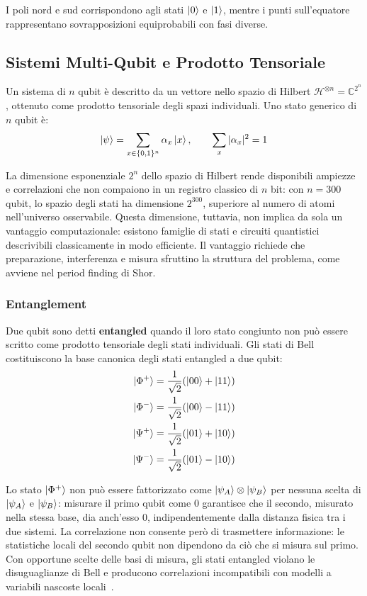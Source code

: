 \begin{onehalfspace}
I poli nord e sud corrispondono agli stati $\ket{0}$ e $\ket{1}$, mentre i punti sull'equatore rappresentano sovrapposizioni equiprobabili con fasi diverse.

\subsection{Sistemi Multi-Qubit e Prodotto Tensoriale}

Un sistema di $n$ qubit è descritto da un vettore nello spazio di Hilbert $\mathcal{H}^{\otimes n} = \mathbb{C}^{2^n}$, ottenuto come prodotto tensoriale degli spazi individuali. Uno stato generico di $n$ qubit è:
\begin{equation}
    \ket{\psi} = \sum_{x \in \{0,1\}^n} \alpha_x \ket{x}, \qquad \sum_{x} |\alpha_x|^2 = 1
\end{equation}

La dimensione esponenziale $2^n$ dello spazio di Hilbert rende disponibili
ampiezze e correlazioni che non compaiono in un registro classico di $n$ bit:
con $n = 300$ qubit, lo spazio degli stati ha dimensione $2^{300}$, superiore
al numero di atomi nell'universo osservabile. Questa dimensione, tuttavia, non
implica da sola un vantaggio computazionale: esistono famiglie di stati e
circuiti quantistici descrivibili classicamente in modo efficiente. Il vantaggio
richiede che preparazione, interferenza e misura sfruttino la struttura del
problema, come avviene nel period finding di Shor.

\subsubsection{Entanglement}

Due qubit sono detti \textbf{entangled} quando il loro stato congiunto non può essere scritto come prodotto tensoriale degli stati individuali. Gli stati di Bell costituiscono la base canonica degli stati entangled a due qubit:
\begin{align}
    \ket{\Phi^+} &= \frac{1}{\sqrt{2}}(\ket{00} + \ket{11}) \\
    \ket{\Phi^-} &= \frac{1}{\sqrt{2}}(\ket{00} - \ket{11}) \\
    \ket{\Psi^+} &= \frac{1}{\sqrt{2}}(\ket{01} + \ket{10}) \\
    \ket{\Psi^-} &= \frac{1}{\sqrt{2}}(\ket{01} - \ket{10})
\end{align}

Lo stato $\ket{\Phi^+}$ non può essere fattorizzato come $\ket{\psi_A} \otimes \ket{\psi_B}$ per nessuna scelta di $\ket{\psi_A}$ e $\ket{\psi_B}$: misurare il primo qubit come $0$ garantisce che il secondo, misurato nella stessa base, dia anch'esso $0$, indipendentemente dalla distanza fisica tra i due sistemi. La correlazione non consente però di trasmettere informazione: le statistiche locali del secondo qubit non dipendono da ciò che si misura sul primo. Con opportune scelte delle basi di misura, gli stati entangled violano le disuguaglianze di Bell e producono correlazioni incompatibili con modelli a variabili nascoste locali~\cite{bell1964,aspect1982}.


\end{onehalfspace}
